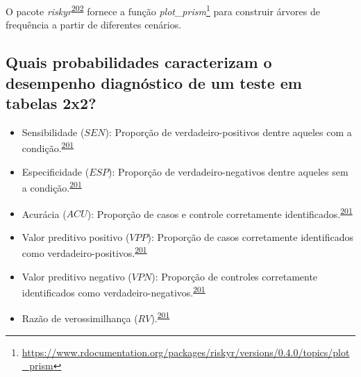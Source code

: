 \documentclass[
  a4paper,
]{book}
\renewcommand{\href}[2]{#2\footnote{\url{#1}}}
\newenvironment{infobox}[1]
  {
  \begin{itemize}
  \renewcommand{\labelitemi}{
    \raisebox{-.7\height}[0pt][0pt]{
      {\setkeys{Gin}{width=3em,keepaspectratio}
        \texttt{[image: \#1]}}
    }
  }
  \setlength{\fboxsep}{1em}
  \begin{blackbox}
  \item
  }
  {
  \end{blackbox}
  \end{itemize}
  }
\begin{document}
\begin{infobox}{images/Rlogo}
O pacote \emph{riskyr}\textsuperscript{\protect\hyperlink{ref-riskyr}{202}} fornece a função \href{https://www.rdocumentation.org/packages/riskyr/versions/0.4.0/topics/plot_prism}{\emph{plot\_prism}} para construir árvores de frequência a partir de diferentes cenários.

\end{infobox}

\hypertarget{quais-probabilidades-caracterizam-o-desempenho-diagnuxf3stico-de-um-teste-em-tabelas-2x2}{%
\subsection{Quais probabilidades caracterizam o desempenho diagnóstico de um teste em tabelas 2x2?}\label{quais-probabilidades-caracterizam-o-desempenho-diagnuxf3stico-de-um-teste-em-tabelas-2x2}}

\begin{itemize}
\item
  Sensibilidade (\(SEN\)): Proporção de verdadeiro-positivos dentre aqueles com a condição.\textsuperscript{\protect\hyperlink{ref-greenhalgh1997b}{201}}
\item
  Especificidade (\(ESP\)): Proporção de verdadeiro-negativos dentre aqueles sem a condição.\textsuperscript{\protect\hyperlink{ref-greenhalgh1997b}{201}}
\item
  Acurácia (\(ACU\)): Proporção de casos e controle corretamente identificados.\textsuperscript{\protect\hyperlink{ref-greenhalgh1997b}{201}}
\item
  Valor preditivo positivo (\(VPP\)): Proporção de casos corretamente identificados como verdadeiro-positivos.\textsuperscript{\protect\hyperlink{ref-greenhalgh1997b}{201}}
\item
  Valor preditivo negativo (\(VPN\)): Proporção de controles corretamente identificados como verdadeiro-negativos.\textsuperscript{\protect\hyperlink{ref-greenhalgh1997b}{201}}
\item
  Razão de verossimilhança (\(RV\)).\textsuperscript{\protect\hyperlink{ref-greenhalgh1997b}{201}}
\end{itemize}
\end{document}
